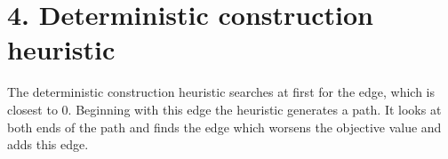 \section*{4. Deterministic construction heuristic}
The deterministic construction heuristic searches at first for the edge, which is closest to 0. Beginning with this edge the heuristic generates a path. It looks at both ends of the path and finds the edge which worsens the objective value and adds this edge.